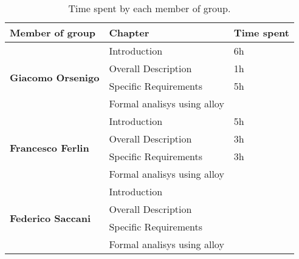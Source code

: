 \begin{table}[H]
    \centering
    \begin{tabular}{|l|l|l|}
        \hline
        \textbf{Member of group }                  & \textbf{Chapter}            & \textbf{Time spent} \\\hline
        \multirow{4}{*}{\textbf{Giacomo Orsenigo}} & Introduction                & 6h                  \\
                                                   & Overall Description         & 1h                  \\
                                                   & Specific Requirements       & 5h                  \\
                                                   & Formal analisys using alloy &                     \\\hline
        \multirow{4}{*}{\textbf{Francesco Ferlin}} & Introduction                & 5h                  \\
                                                   & Overall Description         & 3h                  \\
                                                   & Specific Requirements       & 3h                  \\
                                                   & Formal analisys using alloy &                     \\\hline
        \multirow{4}{*}{\textbf{Federico Saccani}} & Introduction                &                     \\
                                                   & Overall Description         &                     \\
                                                   & Specific Requirements       &                     \\
                                                   & Formal analisys using alloy &                     \\\hline
    \end{tabular}
    \caption{Time spent by each member of group.}
    \label{table:Time spent}
\end{table}
